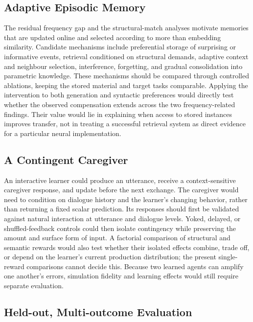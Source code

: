\subsection{Adaptive Episodic Memory}

The residual frequency gap and the structural-match analyses motivate memories that are updated online and selected according to more than embedding similarity. Candidate mechanisms include preferential storage of surprising or informative events, retrieval conditioned on structural demands, adaptive context and neighbour selection, interference, forgetting, and gradual consolidation into parametric knowledge. These mechanisms should be compared through controlled ablations, keeping the stored material and target tasks comparable. Applying the intervention to both \meCDI{} generation and syntactic preferences would directly test whether the observed compensation extends across the two frequency-related findings. Their value would lie in explaining when access to stored instances improves transfer, not in treating a successful retrieval system as direct evidence for a particular neural implementation.

\subsection{A Contingent Caregiver}

An interactive learner could produce an utterance, receive a context-sensitive caregiver response, and update before the next exchange. The caregiver would need to condition on dialogue history and the learner's changing behavior, rather than returning a fixed scalar prediction. Its responses should first be validated against natural interaction at utterance and dialogue levels. Yoked, delayed, or shuffled-feedback controls could then isolate contingency while preserving the amount and surface form of input. A factorial comparison of structural and semantic rewards would also test whether their isolated effects combine, trade off, or depend on the learner's current production distribution; the present single-reward comparisons cannot decide this. Because two learned agents can amplify one another's errors, simulation fidelity and learning effects would still require separate evaluation.

\subsection{Held-out, Multi-outcome Evaluation}


